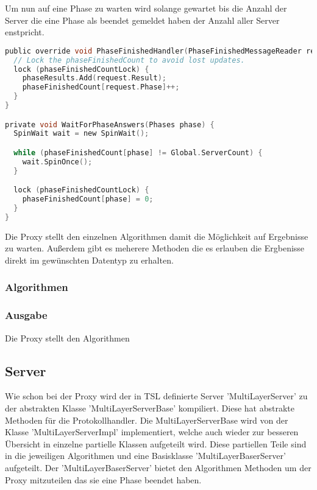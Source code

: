 Um nun auf eine Phase zu warten wird solange gewartet bis die Anzahl der Server die eine Phase als beendet gemeldet haben der Anzahl aller Server enstpricht.

\begin{lstlisting}[language=c]
public override void PhaseFinishedHandler(PhaseFinishedMessageReader request) {
  // Lock the phaseFinishedCount to avoid lost updates.
  lock (phaseFinishedCountLock) {
    phaseResults.Add(request.Result);
    phaseFinishedCount[request.Phase]++;
  }
}

private void WaitForPhaseAnswers(Phases phase) {
  SpinWait wait = new SpinWait();

  while (phaseFinishedCount[phase] != Global.ServerCount) {
    wait.SpinOnce();
  }

  lock (phaseFinishedCountLock) {
    phaseFinishedCount[phase] = 0;
  }
}
\end{lstlisting}

Die Proxy stellt den einzelnen Algorithmen damit die Möglichkeit auf Ergebnisse zu warten. Außerdem gibt es meherere Methoden die es erlauben die Ergbenisse direkt im gewünschten Datentyp zu erhalten.

\subsubsection{Algorithmen}


\subsubsection{Ausgabe}

Die Proxy stellt den Algorithmen 



\subsection{Server}

Wie schon bei der Proxy wird der in TSL definierte Server 'MultiLayerServer' zu der abstrakten Klasse 'MultiLayerServerBase' kompiliert. Diese hat abstrakte Methoden für die Protokollhandler.
Die MultiLayerServerBase wird von der Klasse 'MultiLayerServerImpl' implementiert, welche auch wieder zur besseren Übersicht in einzelne partielle Klassen aufgeteilt wird. Diese partiellen Teile sind in die jeweiligen Algorithmen und eine Basisklasse 'MultiLayerBaserServer' aufgeteilt.
Der 'MultiLayerBaserServer' bietet den Algorithmen Methoden um der Proxy mitzuteilen das sie eine Phase beendet haben.


